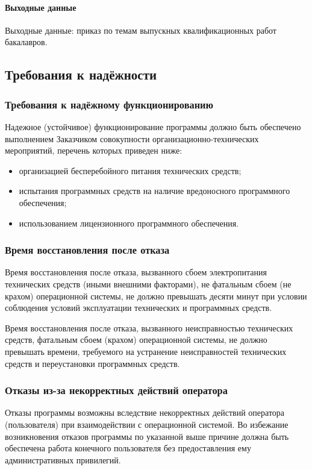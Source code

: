 \documentclass[utf8x]{article}
\begin{document}
\begin{flushleft}
\paragraph{Выходные данные}
Выходные данные: приказ по темам выпускных квалификационных работ бакалавров.

\subsection{Требования к надёжности}
\subsubsection{Требования к надёжному функционированию}

Надежное (устойчивое) функционирование программы должно быть обеспечено выполнением Заказчиком совокупности организационно-технических мероприятий, перечень которых приведен ниже:
\begin{itemize}

\item организацией бесперебойного питания технических средств;
\item испытания программных средств на наличие вредоносного программного обеспечения;
\item использованием лицензионного программного обеспечения.
\end{itemize}

\subsubsection{Время восстановления после отказа}

Время восстановления после отказа, вызванного сбоем электропитания технических средств (иными внешними факторами), не фатальным сбоем (не крахом) операционной системы, не должно превышать десяти минут при условии соблюдения условий эксплуатации технических и программных средств.

Время восстановления после отказа, вызванного неисправностью технических средств, фатальным сбоем (крахом) операционной системы, не должно превышать времени, требуемого на устранение неисправностей технических средств и переустановки программных средств.

\subsubsection{Отказы из-за некорректных действий оператора}

Отказы программы возможны вследствие некорректных действий оператора (пользователя) при взаимодействии с операционной системой. Во избежание возникновения отказов программы по указанной выше причине должна быть обеспечена работа конечного пользователя без предоставления ему административных привилегий.


\end{flushleft}
\end{document}
